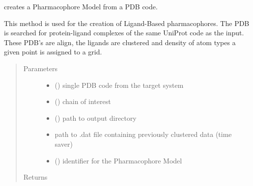 \documentclass[letterpaper,10pt,english]{sphinxmanual}
\begin{document}
\begin{fulllineitems}
\begin{fulllineitems}
\end{fulllineitems}


\begin{fulllineitems}
\label{\detokenize{hs_pharmacophore_api:hotspots.hs_pharmacophore.PharmacophoreModel.from_pdb}}
creates a Pharmacophore Model from a PDB code.

This method is used for the creation of Ligand-Based pharmacophores. The PDB is searched for protein-ligand
complexes of the same UniProt code as the input. These PDB’s are align, the ligands are clustered and density
of atom types a given point is assigned to a grid.
\begin{quote}\begin{description}
\item[{Parameters}] \leavevmode\begin{itemize}
\item {} 
 () \textendash{} single PDB code from the target system

\item {} 
 () \textendash{} chain of interest

\item {} 
 () \textendash{} path to output directory

\item {} 
 \textendash{} path to .dat file containing previously clustered data (time saver)

\item {} 
 () \textendash{} identifier for the Pharmacophore Model

\end{itemize}

\item[{Returns}] \leavevmode
{\hyperref[\detokenize{hs_pharmacophore_api:hotspots.hs_pharmacophore.PharmacophoreModel}]{}}


\end{description}
\end{quote}
\end{fulllineitems}
\end{fulllineitems}
\end{document}
